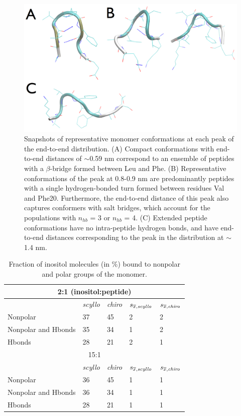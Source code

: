 \begin{figure}[ht]
\centering
\includegraphics[width=14cm]{figures/appendixA/inos2_figures_SI_monomerConformations.pdf}
\caption{Snapshots of representative monomer conformations at each peak of the end-to-end distribution. 
(A)  Compact conformations with end-to-end distances of $\sim$0.59 nm correspond to an ensemble of peptides with a $\beta$-bridge formed between Leu and Phe. (B) Representative conformations of the peak at 0.8-0.9 nm are predominantly peptides with a single hydrogen-bonded turn formed between residues Val and Phe20. Furthermore, the end-to-end distance of this peak also captures conformers with salt bridges, which account for the populations with $n_{hb}$ = 3 or $n_{hb}$ = 4. (C)  Extended peptide conformations have no intra-peptide hydrogen bonds, and have end-to-end distances corresponding to the peak in the distribution at $\sim$1.4 nm.}
\label{fig:SI-monomersConformations}
\end{figure}

\begin{table}[ht]
\centering
\begin{tabular}{|l|llll|}
\hline
\multicolumn{5}{|c|}{2:1 (inositol:peptide)} \\ 
\hline
& \emph{scyllo} & \emph{chiro} & $s_{\overline{x}, \emph{scyllo}}$ & $s_{\overline{x}, \emph{chiro}}$ \\ 
\hline
Nonpolar & 37 & 45 & 2 & 2 \\ 
Nonpolar and Hbonds & 35 & 34 & 1 & 2 \\ 
Hbonds & 28 & 21 & 2 & 1 \\
\hline
\hline
\multicolumn{5}{|c|}{15:1} \\ 
\hline
 & \emph{scyllo} & \emph{chiro} & $s_{\overline{x}, \emph{scyllo}}$ & $s_{\overline{x}, \emph{chiro}}$ \\ 
\hline
Nonpolar & 36 & 45 & 1 & 1 \\
Nonpolar and Hbonds & 36 & 34 & 1 & 1 \\ 
Hbonds & 28 & 21 & 1 & 1 \\
\hline
\end{tabular}
\caption{Fraction of inositol molecules (in \%) bound to nonpolar and polar groups of the monomer.}    
\label{tbl:SI-monomersBindingMode}
\end{table}

